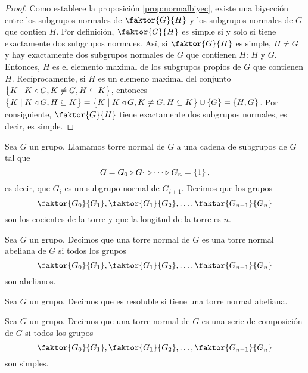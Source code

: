 \begin{proof}
    Como establece la proposición \ref{prop:normalbiyec}, existe una biyección entre los subgrupos normales de $\faktor{G}{H}$ y los subgrupos 
    normales de $G$ que contien $H$. Por definición, $\faktor{G}{H}$ es simple si y solo si tiene exactamente dos subgrupos normales. Así, 
    si $\faktor{G}{H}$ es simple, $H\neq G$ y hay exactamente dos subgrupos normales de $G$ que contienen $H$: $H$ y $G$. Entonces, $H$ es el elemento maximal 
    de los subgrupos propios de $G$ que contienen $H$. Recíprocamente, si $H$ es un elemeno maximal del conjunto $\left\{ K\mid K\triangleleft G, 
    K\neq G, H\subseteq K\right\}$, entonces $\left\{ K\mid K\triangleleft G, H\subseteq K\right\} = \left\{ K\mid K\triangleleft G, K\neq G, H\subseteq K\right\} 
    \cup \left\{ G\right\}=\left\{ H, G\right\}$. Por consiguiente, $\faktor{G}{H}$ tiene exactamente dos subgrupos normales, es decir, es simple.
\end{proof}
\begin{defi}
    Sea $G$ un grupo. Llamamos torre normal de $G$ a una cadena de subgrupos de $G$ tal que
    \[
        G=G_0\triangleright G_1\triangleright\cdots\triangleright G_n=\left\{ 1\right\},
    \]
    es decir, que $G_i$ es un subgrupo normal de $G_{i+1}$. Decimos que los grupos
    \[
        \faktor{G_0}{G_1}, \faktor{G_1}{G_2}, \dots, \faktor{G_{n-1}}{G_n}
    \]
    son los cocientes de la torre y que la longitud de la torre es $n$.
\end{defi}
\begin{defi}
    Sea $G$ un grupo. Decimos que una torre normal de $G$ es una torre normal abeliana de $G$ si todos los grupos
    \[
        \faktor{G_0}{G_1}, \faktor{G_1}{G_2}, \dots, \faktor{G_{n-1}}{G_n}
    \]
    son abelianos.
\end{defi}
\begin{defi}
    Sea $G$ un grupo. Decimos que es resoluble si tiene una torre normal abeliana.
\end{defi}
\begin{defi}
    Sea $G$ un grupo. Decimos que una torre normal de $G$ es una serie de composición de $G$ si todos los grupos
    \[
        \faktor{G_0}{G_1}, \faktor{G_1}{G_2}, \dots, \faktor{G_{n-1}}{G_n}
    \]
    son simples.
\end{defi}
